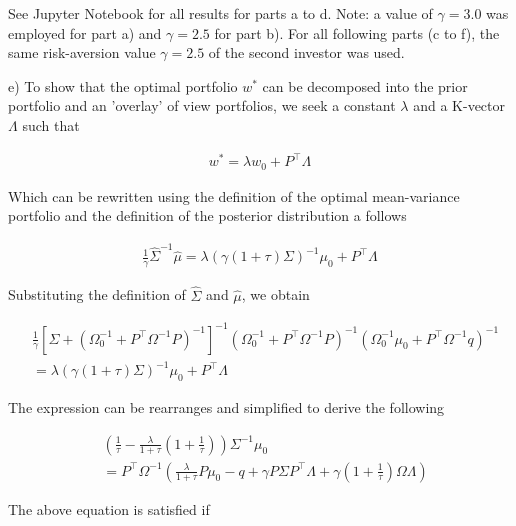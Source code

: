 \documentclass[10pt]{article}
\newenvironment{exercise}[2][Exercise]{\begin{trivlist}
  \item[\hskip \labelsep {\bfseries #1}\hskip \labelsep {\bfseries #2.}]}{\end{trivlist}}
\begin{document}
\newpage

\begin{exercise}{2}
\end{exercise}

See Jupyter Notebook for all results for parts a to d. Note: a value of $\gamma = 3.0$ was employed for part a) and $\gamma = 2.5$ for part b). For all following parts (c to f), the same risk-aversion value $\gamma = 2.5$ of the second investor was used.  

\bigbreak

e) To show that the optimal portfolio $w^*$ can be decomposed into the prior portfolio and an 'overlay' of view portfolios, we seek a constant $\lambda$ and a K-vector $\Lambda$ such that 

\begin{align*}
	w^* = \lambda w_0 + P^\top \Lambda
\end{align*}

Which can be rewritten using the definition of the optimal mean-variance portfolio and the definition of the posterior distribution a follows

\begin{align*}
	\frac{1}{\gamma} \hat{\Sigma}^{-1}\hat{\mu} = \lambda (\gamma (1 + \tau) \Sigma)^{-1} \mu_0 + P^\top \Lambda
\end{align*}

Substituting the definition of $\hat{\Sigma}$ and $\hat{\mu}$, we obtain

\begin{align*}
	&\frac{1}{\gamma} \left[ \Sigma + \left( \Omega_0^{-1} + P^\top \Omega^{-1}P \right)^{-1} \right]^{-1} \left( \Omega_0^{-1} + P^\top \Omega^{-1} P \right)^{-1} \left( \Omega_0^{-1}\mu_0 + P^\top \Omega^{-1} q \right)^{-1} \\
	& = \lambda(\gamma ( 1 + \tau) \Sigma)^{-1} \mu_0 + P^\top \Lambda
\end{align*}

The expression can be rearranges and simplified to derive the following

\begin{align*}
	&\left( \frac{1}{\tau} - \frac{\lambda}{1+\tau} \left( 1 + \frac{1}{\tau} \right) \right) \Sigma^{-1} \mu_0 \\
	&= P^\top \Omega^{-1} \left( \frac{\lambda}{1 + \tau} P \mu_0 - q + \gamma P \Sigma P^\top \Lambda + \gamma \left( 1 + \frac{1}{\tau} \right)  \Omega \Lambda \right)
\end{align*}

The above equation is satisfied if 
\end{document}
